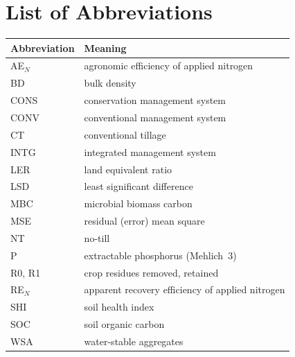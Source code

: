\chapter{List of Abbreviations}

\begin{center}
\begin{tabular}{@{}ll@{}}
  \toprule
  Abbreviation & Meaning \\
  \midrule
  AE$_N$   & agronomic efficiency of applied nitrogen \\
  BD       & bulk density \\
  CONS     & conservation management system \\
  CONV     & conventional management system \\
  CT       & conventional tillage \\
  INTG     & integrated management system \\
  LER      & land equivalent ratio \\
  LSD      & least significant difference \\
  MBC      & microbial biomass carbon \\
  MSE      & residual (error) mean square \\
  NT       & no-till \\
  P        & extractable phosphorus (Mehlich~3) \\
  R0, R1   & crop residues removed, retained \\
  RE$_N$   & apparent recovery efficiency of applied nitrogen \\
  SHI      & soil health index \\
  SOC      & soil organic carbon \\
  WSA      & water-stable aggregates \\
  \bottomrule
\end{tabular}
\end{center}
